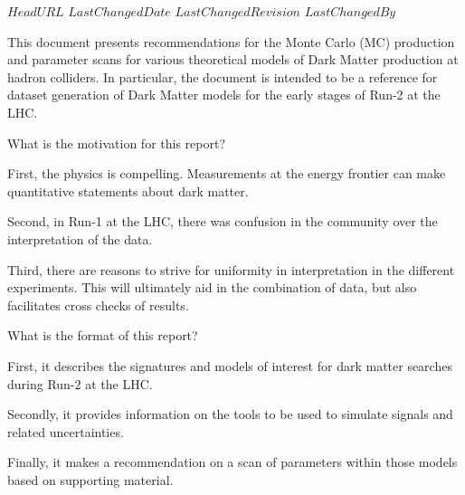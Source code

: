 \svnidlong
{$HeadURL$}
{$LastChangedDate$}
{$LastChangedRevision$}
{$LastChangedBy$}
\pagestyle{fancy}
\fancyhead{}
\fancyhead[ol]{\svnrev;\svndate;\svnauthor}

This document presents recommendations for
the Monte Carlo (MC) production and parameter scans
for various theoretical models of Dark Matter production
at hadron colliders.  In particular, the document is
intended to be a reference for dataset generation of
Dark Matter models for the early stages of Run-2 at the LHC.

What is the motivation for this report?

First, the physics is compelling.   Measurements at the energy
frontier can make quantitative statements about dark matter.

Second, in Run-1 at the LHC, there was confusion in the community
over the interpretation of the data.

Third, there are reasons to strive for uniformity in interpretation
in the different experiments.  This will ultimately aid in the
combination of data, but also facilitates cross checks of results.

What is the format of this report?

First, it describes the signatures and models of interest for
dark matter searches during Run-2 at the LHC.

Secondly, it provides information on the tools to be used to
simulate signals and related uncertainties.

Finally, it makes a recommendation on a scan of parameters within
those models based on supporting material.

